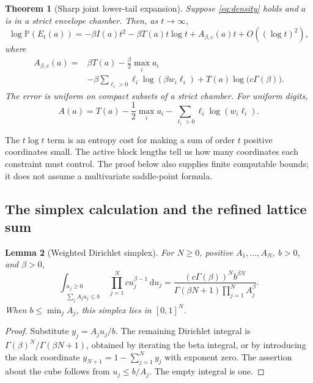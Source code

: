\documentclass[11pt,a4paper]{article}
\newtheorem{theorem}{Theorem}[section]
\newtheorem{lemma}[theorem]{Lemma}
\theoremstyle{definition}
\theoremstyle{remark}
\newcommand{\PP}{\mathbb P}
\newcommand{\dd}{\,\mathrm d}
\numberwithin{equation}{section}
\begin{document}
\begin{theorem}[Sharp joint lower-tail expansion]
\label{thm:sharp}
Suppose \eqref{eq:density} holds and $a$ is in a strict envelope chamber.
Then, as $t\to\infty$,
\begin{equation}
 \log\PP(E_t(a))
 =-\beta I(a)t^2-\beta T(a)t\log t+A_{\beta,c}(a)t
 +O((\log t)^2),
 \label{eq:sharp-law}
\end{equation}
where
\begin{equation}
 \begin{split}
 A_{\beta,c}(a)={}&\beta T(a)-\frac{\beta}{2}\max_i a_i\\
 &-\beta\sum_{\ell_i>0}\ell_i\log(\beta w_i\ell_i)
 +T(a)\log\bigl(c\Gamma(\beta)\bigr).
 \end{split}
 \label{eq:A}
\end{equation}
The error is uniform on compact subsets of a strict chamber. For uniform
digits,
\begin{equation}
 A(a)=T(a)-\frac12\max_i a_i
       -\sum_{\ell_i>0}\ell_i\log(w_i\ell_i).
 \label{eq:A-uniform}
\end{equation}
\end{theorem}

The $t\log t$ term is an entropy cost for making a sum of order $t$
positive coordinates small. The active block lengths tell us how many
coordinates each constraint must control. The proof below also supplies
finite computable bounds; it does not assume a multivariate saddle-point
formula.

\subsection{The simplex calculation and the refined lattice sum}

\begin{lemma}[Weighted Dirichlet simplex]
\label{lem:simplex}
For $N\ge0$, positive $A_1,\ldots,A_N$, $b>0$, and $\beta>0$,
\begin{equation}
 \int_{\substack{u_j\ge0\\\sum_j A_ju_j\le b}}
       \prod_{j=1}^N c u_j^{\beta-1}\dd u_j
 =\frac{(c\Gamma(\beta))^N b^{\beta N}}
 {\Gamma(\beta N+1)\prod_{j=1}^N A_j^\beta}.
 \label{eq:simplex}
\end{equation}
When $b\le\min_j A_j$, this simplex lies in $[0,1]^N$.
\end{lemma}
\begin{proof}
Substitute $y_j=A_ju_j/b$. The remaining Dirichlet integral is
$\Gamma(\beta)^N/\Gamma(\beta N+1)$, obtained by iterating the beta
integral, or by introducing the slack coordinate
$y_{N+1}=1-\sum_{j=1}^N y_j$ with exponent zero. The assertion about the
cube follows from $u_j\le b/A_j$. The empty integral is one.
\end{proof}
\end{document}
